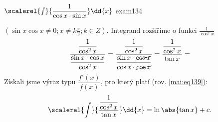\begin{mathexam}{\(\protect\scalerel{\int}{\dfrac{1}{\cos x\cdot\sin x}}\dd{x}\)
  \hfill\cite[s.~31]{Knichal}}{exam134} 
   
  \((\sin x\cos x\neq0; x\neq k\frac{\pi}{2}; k\in Z)\). Integrand rozšíříme o funkci
  \(\frac{1}{\cos^2x}\)
  \begin{equation*}
    \dfrac{\dfrac{1}{\cos^2x}}{\dfrac{\sin x\cdot\cos x}{\cos^2x}}  = 
    \dfrac{\dfrac{1}{\cos^2x}}{\dfrac{\sin x\cdot\cancel{\cos x}}{\cos x\cdot\cancel{\cos x}}} = 
    \dfrac{\dfrac{1}{\cos^2x}}{\tan x} = 
  \end{equation*}  
  Získali jsme výraz typu \(\dfrac{f'(x)}{f(x)}\), pro který platí (rov. \ref{mai:eq139}):  
  \begin{equation*}
    \scalerel{\int}{\dfrac{\dfrac{1}{\cos^2x}}{\tan x}}\dd{x} = \ln\abs{\tan x} + c.
  \end{equation*}    
\end{mathexam}